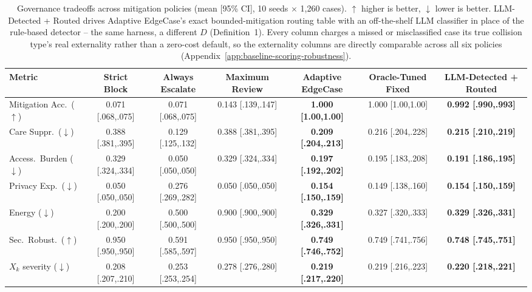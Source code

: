 \documentclass[letterpaper]{article} %
\begin{document}
\begin{table}[t]
\centering
\scriptsize
\setlength{\tabcolsep}{3.5pt}
\begin{tabular}{lcccccc}
\toprule
Metric & Strict Block & Always Escalate & Maximum Review & \textbf{Adaptive EdgeCase} & Oracle-Tuned Fixed & \textbf{LLM-Detected + Routed} \\
\midrule
Mitigation Acc.\ ($\uparrow$) & 0.071 [.068,.075] & 0.071 [.068,.075] & 0.143 [.139,.147] & \textbf{1.000 [1.00,1.00]} & 1.000 [1.00,1.00] & \textbf{0.992 [.990,.993]} \\
Care Suppr.\ ($\downarrow$) & 0.388 [.381,.395] & 0.129 [.125,.132] & 0.388 [.381,.395] & \textbf{0.209 [.204,.213]} & 0.216 [.204,.228] & \textbf{0.215 [.210,.219]} \\
Access.\ Burden ($\downarrow$) & 0.329 [.324,.334] & 0.050 [.050,.050] & 0.329 [.324,.334] & \textbf{0.197 [.192,.202]} & 0.195 [.183,.208] & \textbf{0.191 [.186,.195]} \\
Privacy Exp.\ ($\downarrow$) & 0.050 [.050,.050] & 0.276 [.269,.282] & 0.050 [.050,.050] & \textbf{0.154 [.150,.159]} & 0.149 [.138,.160] & \textbf{0.154 [.150,.159]} \\
Energy ($\downarrow$) & 0.200 [.200,.200] & 0.500 [.500,.500] & 0.900 [.900,.900] & \textbf{0.329 [.326,.331]} & 0.327 [.320,.333] & \textbf{0.329 [.326,.331]} \\
Sec.\ Robust.\ ($\uparrow$) & 0.950 [.950,.950] & 0.591 [.585,.597] & 0.950 [.950,.950] & \textbf{0.749 [.746,.752]} & 0.749 [.741,.756] & \textbf{0.748 [.745,.751]} \\
$X_k$ severity ($\downarrow$) & 0.208 [.207,.210] & 0.253 [.253,.254] & 0.278 [.276,.280] & \textbf{0.219 [.217,.220]} & 0.219 [.216,.223] & \textbf{0.220 [.218,.221]} \\
\bottomrule
\end{tabular}
\caption{Governance tradeoffs across mitigation policies (mean [95\% CI], 10 seeds $\times$ 1,260 cases). $\uparrow$ higher is better, $\downarrow$ lower is better. LLM-Detected + Routed drives Adaptive EdgeCase's exact bounded-mitigation routing table with an off-the-shelf LLM classifier in place of the rule-based detector -- the same harness, a different $D$ (Definition~1). Every column charges a missed or misclassified case its true collision type's real externality rather than a zero-cost default, so the externality columns are directly comparable across all six policies (Appendix~\ref{app:baseline-scoring-robustness}).}
\label{tab:governance-tradeoffs}
\end{table}
\end{document}
